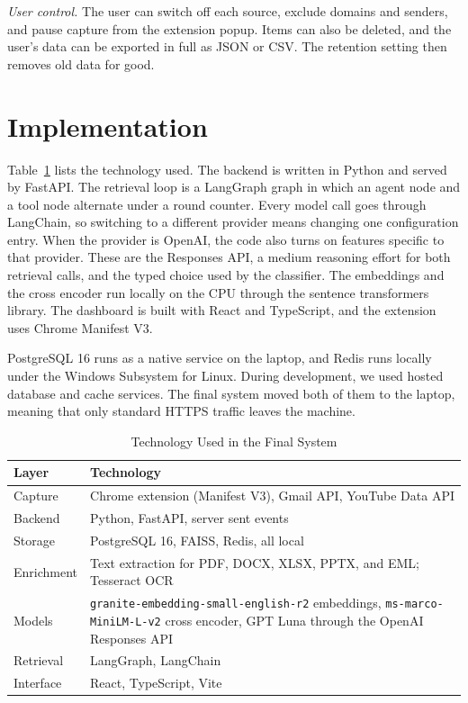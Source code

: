 \documentclass[conference]{IEEEtran}
\newcommand{\embmodel}{\texttt{granite\allowbreak-embedding\allowbreak-small\allowbreak-english\allowbreak-r2}}
\newcommand{\rerankmodel}{\texttt{ms\allowbreak-marco\allowbreak-MiniLM\allowbreak-L\allowbreak-6\allowbreak-v2}}
\newcommand{\llmname}{GPT\nobreakdash-5.6 Luna}
\begin{document}
\textit{User control.} The user can switch off each source, exclude domains and senders, and pause capture from the extension popup. Items can also be deleted, and the user's data can be exported in full as JSON or CSV. The retention setting then removes old data for good.

\section{Implementation}\label{sec:impl}
Table~\ref{tab:stack} lists the technology used. The backend is written in Python and served by FastAPI. The retrieval loop is a LangGraph graph \cite{b5} in which an agent node and a tool node alternate under a round counter. Every model call goes through LangChain, so switching to a different provider means changing one configuration entry. When the provider is OpenAI, the code also turns on features specific to that provider. These are the Responses API, a medium reasoning effort for both retrieval calls, and the typed choice used by the classifier. The embeddings and the cross encoder run locally on the CPU through the sentence transformers library. The dashboard is built with React and TypeScript, and the extension uses Chrome Manifest V3.

PostgreSQL 16 runs as a native service on the laptop, and Redis runs locally under the Windows Subsystem for Linux. During development, we used hosted database and cache services. The final system moved both of them to the laptop, meaning that only standard HTTPS traffic leaves the machine.

\begin{table}[t]
\caption{Technology Used in the Final System}
\label{tab:stack}
\centering
\renewcommand{\arraystretch}{1.15}
\begin{tabular}{|>{\raggedright\arraybackslash}p{2.0cm}|>{\raggedright\arraybackslash}p{5.55cm}|}
\hline
\textbf{Layer} & \textbf{Technology} \\
\hline
Capture & Chrome extension (Manifest V3), Gmail API, YouTube Data API \\
\hline
Backend & Python, FastAPI, server sent events \\
\hline
Storage & PostgreSQL 16, FAISS, Redis, all local \\
\hline
Enrichment & Text extraction for PDF, DOCX, XLSX, PPTX, and EML; Tesseract OCR \\
\hline
Models & \embmodel{} embeddings, \rerankmodel{} cross encoder, \llmname{} through the OpenAI Responses API \\
\hline
Retrieval & LangGraph, LangChain \\
\hline
Interface & React, TypeScript, Vite \\
\hline
\end{tabular}
\end{table}
\end{document}
